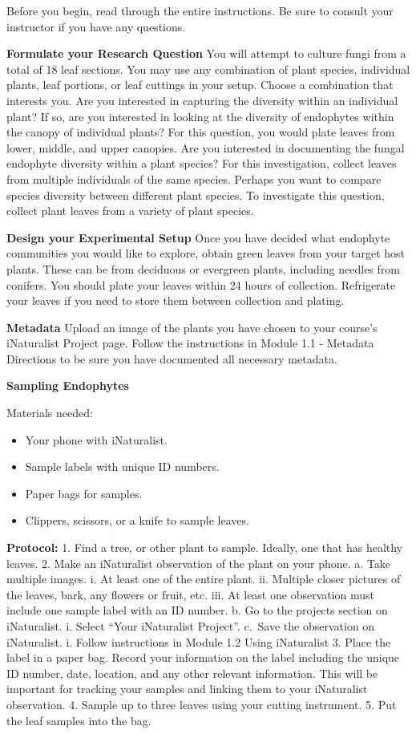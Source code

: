 \documentclass[
  letterpaper,
  DIV=11,
  numbers=noendperiod]{scrreprt}
\providecommand{\tightlist}{%
  \setlength{\itemsep}{0pt}\setlength{\parskip}{0pt}}
\begin{document}
Before you begin, read through the entire instructions. Be sure to
consult your instructor if you have any questions.

\textbf{Formulate your Research Question} You will attempt to culture
fungi from a total of 18 leaf sections. You may use any combination of
plant species, individual plants, leaf portions, or leaf cuttings in
your setup. Choose a combination that interests you. Are you interested
in capturing the diversity within an individual plant? If so, are you
interested in looking at the diversity of endophytes within the canopy
of individual plants? For this question, you would plate leaves from
lower, middle, and upper canopies. Are you interested in documenting the
fungal endophyte diversity within a plant species? For this
investigation, collect leaves from multiple individuals of the same
species. Perhaps you want to compare species diversity between different
plant species. To investigate this question, collect plant leaves from a
variety of plant species.

\textbf{Design your Experimental Setup} Once you have decided what
endophyte communities you would like to explore, obtain green leaves
from your target host plants. These can be from deciduous or evergreen
plants, including needles from conifers. You should plate your leaves
within 24 hours of collection. Refrigerate your leaves if you need to
store them between collection and plating.

\textbf{Metadata} Upload an image of the plants you have chosen to your
course's iNaturalist Project page. Follow the instructions in Module 1.1
- Metadata Directions to be sure you have documented all necessary
metadata.

\textbf{Sampling Endophytes}

Materials needed:

\begin{itemize}
\tightlist
\item[$\square$]
  Your phone with iNaturalist.
\item[$\square$]
  Sample labels with unique ID numbers.
\item[$\square$]
  Paper bags for samples.
\item[$\square$]
  Clippers, scissors, or a knife to sample leaves.
\end{itemize}

\textbf{Protocol:} 1. Find a tree, or other plant to sample. Ideally,
one that has healthy leaves. 2. Make an iNaturalist observation of the
plant on your phone. a. Take multiple images. i. At least one of the
entire plant. ii. Multiple closer pictures of the leaves, bark, any
flowers or fruit, etc. iii. At least one observation must include one
sample label with an ID number. b. Go to the projects section on
iNaturalist. i. Select ``Your iNaturalist Project''. c.~Save the
observation on iNaturalist. i. Follow instructions in Module 1.2 Using
iNaturalist 3. Place the label in a paper bag. Record your information
on the label including the unique ID number, date, location, and any
other relevant information. This will be important for tracking your
samples and linking them to your iNaturalist observation. 4. Sample up
to three leaves using your cutting instrument. 5. Put the leaf samples
into the bag.
\end{document}
